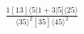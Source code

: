 \documentclass[varwidth, border=5pt]{standalone}
\begin{document}
\begin{my}
$\begin{gathered}
\scriptscriptstyle\frac{1[13]⟨5|1+3|5]⟨25⟩}{⟨35⟩^2[35]⟨45⟩^2}
\end{gathered}$
\end{my}
\end{document}
